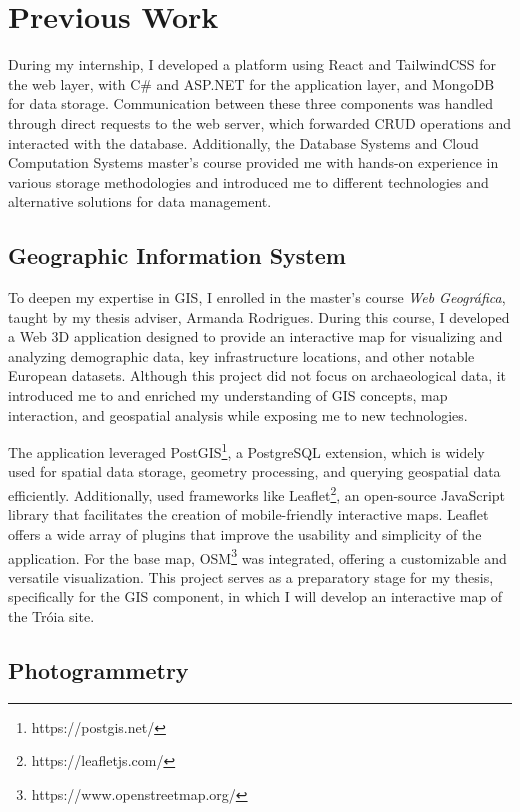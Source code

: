 \section{Previous Work}
\label{sec:previous_work}

During my internship, I developed a platform using React and TailwindCSS for the web layer, with C\# and ASP.NET for the application layer, and MongoDB for data storage. Communication between these three components was handled through direct requests to the web server, which forwarded CRUD operations and interacted with the database.  
Additionally, the Database Systems and Cloud Computation Systems master's course provided me with hands-on experience in various storage methodologies and introduced me to different technologies and alternative solutions for data management.

\subsection{Geographic Information System}
\label{sec:gis_previous} 

To deepen my expertise in \gls{GIS}, I enrolled in the master's course \textit{Web Geográfica}, taught by my thesis adviser, Armanda Rodrigues. During this course, I developed a Web \gls{3D} application designed to provide an interactive map for visualizing and analyzing demographic data, key infrastructure locations, and other notable European datasets. Although this project did not focus on archaeological data, it introduced me to and enriched my understanding of GIS concepts, map interaction, and geospatial analysis while exposing me to new technologies.

The application leveraged PostGIS\footnote{https://postgis.net/}, a PostgreSQL extension, which is widely used for spatial data storage, geometry processing, and querying geospatial data efficiently.
Additionally, used frameworks like Leaflet\footnote{https://leafletjs.com/}, an open-source JavaScript library that facilitates the creation of mobile-friendly interactive maps. Leaflet offers a wide array of plugins that improve the usability and simplicity of the application. For the base map, \gls{OSM}\footnote{https://www.openstreetmap.org/} was integrated, offering a customizable and versatile visualization. This project serves as a preparatory stage for my thesis, specifically for the \gls{GIS} component, in which I will develop an interactive map of the Tróia site.

\subsection{Photogrammetry}
\label{sec:photogrammetry_previous} 

